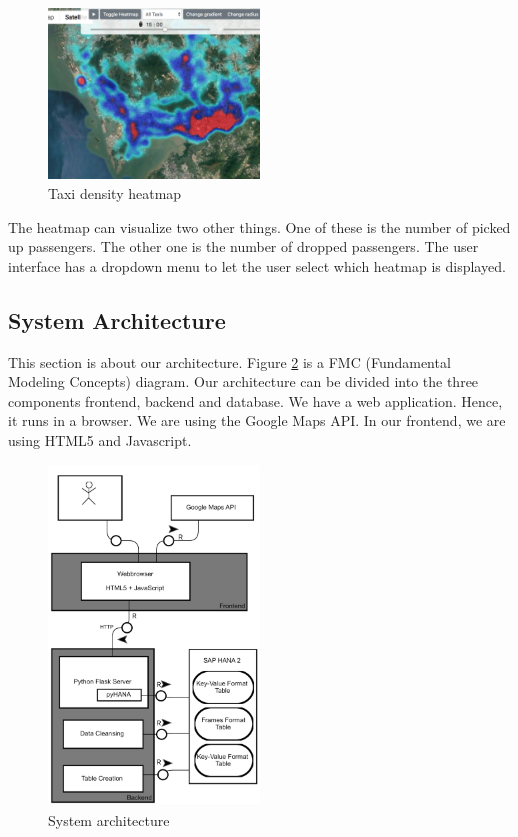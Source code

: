 \documentclass[10pt]{sig-alternate}
\begin{document}
\begin{figure}[ht]
\centering
\includegraphics[width=0.5\textwidth]{img/density.png}
\caption{Taxi density heatmap}
\label{fig:density}
\end{figure}

The heatmap can visualize two other things. One of these is the number of picked up passengers. The other one is the number of dropped passengers. The user interface has a dropdown menu to let the user select which heatmap is displayed.

\subsection{System Architecture}

This section is about our architecture. Figure \ref{fig:architecture} is a FMC (Fundamental Modeling Concepts) diagram. Our architecture can be divided into the three components frontend, backend and database. We have a web application. Hence, it runs in a browser. We are using the Google Maps API. In our frontend, we are using HTML5 and Javascript.\\

\begin{figure}[ht]
\centering
\includegraphics[width=0.5\textwidth]{img/architecture.png}
\caption{System architecture}
\label{fig:architecture}
\end{figure}
\end{document}
